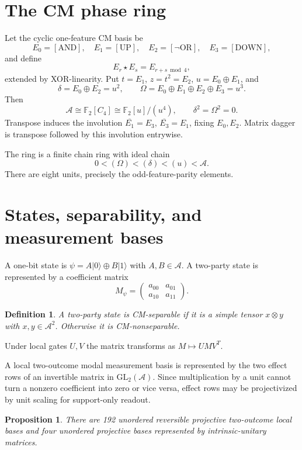 \documentclass[11pt]{article}
\newtheorem{proposition}{Proposition}
\newtheorem{definition}{Definition}
\newcommand{\A}{\mathcal A}
\newcommand{\F}{\mathbb F}
\newcommand{\xorp}{\mathbin{\oplus}}
\newcommand{\starp}{\mathbin{\star}}
\newcommand{\ket}[1]{\lvert #1\rangle}
\begin{document}
\section{The CM phase ring}

Let the cyclic one-feature CM basis be
\[
E_0=[\mathrm{AND}],\quad E_1=[\mathrm{UP}],\quad
E_2=[\neg\mathrm{OR}],\quad E_3=[\mathrm{DOWN}],
\]
and define
\[
E_r\starp E_s=E_{r+s\bmod 4},
\]
extended by XOR-linearity.  Put $t=E_1$, $z=t^2=E_2$,
$u=E_0\xorp E_1$, and
\[
\delta=E_0\xorp E_2=u^2,\qquad
\Omega=E_0\xorp E_1\xorp E_2\xorp E_3=u^3.
\]
Then
\[
\A\cong\F_2[C_4]\cong\F_2[u]/(u^4),\qquad
\delta^2=\Omega^2=0.
\]
Transpose induces the involution $\overline{E_1}=E_3$,
$\overline{E_3}=E_1$, fixing $E_0,E_2$.  Matrix dagger is transpose followed
by this involution entrywise.

The ring is a finite chain ring with ideal chain
\[
0<(\Omega)<(\delta)<(u)<\A.
\]
There are eight units, precisely the odd-feature-parity elements.

\section{States, separability, and measurement bases}

A one-bit state is $\psi=A\ket0\xorp B\ket1$ with $A,B\in\A$.
A two-party state is represented by a coefficient matrix
\[
M_\psi=\begin{pmatrix}a_{00}&a_{01}\\a_{10}&a_{11}\end{pmatrix}.
\]

\begin{definition}
A two-party state is \emph{CM-separable} if it is a simple tensor
$x\otimes y$ with $x,y\in\A^2$.  Otherwise it is
\emph{CM-nonseparable}.
\end{definition}

Under local gates $U,V$ the matrix transforms as
$M\mapsto UMV^T$.

A local two-outcome modal measurement basis is represented by the two effect
rows of an invertible matrix in $\mathrm{GL}_2(\A)$.  Since multiplication by
a unit cannot turn a nonzero coefficient into zero or vice versa, effect rows
may be projectivized by unit scaling for support-only readout.

\begin{proposition}
There are 192 unordered reversible projective two-outcome local bases and four
unordered projective bases represented by intrinsic-unitary matrices.
\end{proposition}
\end{document}
